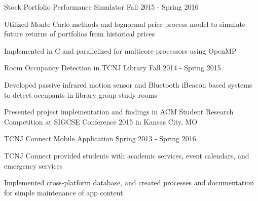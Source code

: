 

\begin{cventries}

  \bproject
    {Stock Portfolio Performance Simulator} %
    {Fall 2015 - Spring 2016} %
    {
      \begin{cvitems} %
        \item {Utilized Monte Carlo methods and lognormal price process model to simulate future returns of portfolios from historical prices}
        \item {Implemented in C and parallelized for multicore processors using OpenMP}
      \end{cvitems}
    }

  \bproject
    {Room Occupancy Detection in TCNJ Library} %
    {Fall 2014 - Spring 2015} %
    {
      \begin{cvitems} %
        \item {Developed passive infrared motion sensor and Bluetooth iBeacon based systems to detect occupants in library group study rooms}
        \item {Presented project implementation and findings in ACM Student Research Competition at SIGCSE Conference 2015 in Kansas City, MO}
      \end{cvitems}
    }

  \bproject
    {TCNJ Connect Mobile Application} %
    {Spring 2013 - Spring 2016} %
    {
      \begin{cvitems} %
        \item {TCNJ Connect provided students with academic services, event calendars, and emergency services}
        \item {Implemented cross-platform database, and created processes and documentation for simple maintenance of app content}
      \end{cvitems}
    }

\end{cventries}
